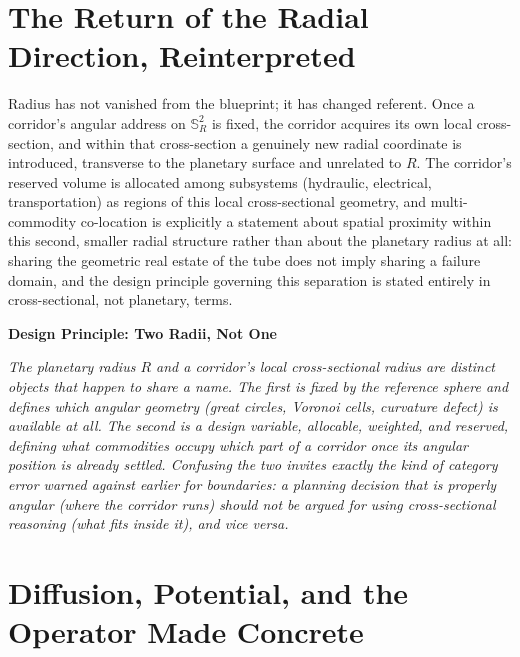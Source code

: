 \documentclass[11pt,fleqn]{book}
\numberwithin{equation}{chapter}
\newenvironment{principle}[1]
  {\begin{principleEnv}
   \noindent\textbf{Design Principle: #1}\par\smallskip\itshape}
  {\end{principleEnv}}
\theoremstyle{plain}
\theoremstyle{definition}
\theoremstyle{remark}
\newcommand{\Sphere}{\mathbb{S}^{2}}
\begin{document}
\section{The Return of the Radial Direction, Reinterpreted}

Radius has not vanished from the blueprint; it has changed referent. Once a corridor's angular address on \(\Sphere_R\) is fixed, the corridor acquires its own local cross-section, and within that cross-section a genuinely new radial coordinate is introduced, transverse to the planetary surface and unrelated to \(R\). The corridor's reserved volume is allocated among subsystems (hydraulic, electrical, transportation) as regions of this local cross-sectional geometry, and multi-commodity co-location is explicitly a statement about spatial proximity within this second, smaller radial structure rather than about the planetary radius at all: sharing the geometric real estate of the tube does not imply sharing a failure domain, and the design principle governing this separation is stated entirely in cross-sectional, not planetary, terms.

\begin{principle}{Two Radii, Not One}
The planetary radius \(R\) and a corridor's local cross-sectional radius are distinct objects that happen to share a name. The first is fixed by the reference sphere and defines which angular geometry (great circles, Voronoi cells, curvature defect) is available at all. The second is a design variable, allocable, weighted, and reserved, defining what commodities occupy which part of a corridor once its angular position is already settled. Confusing the two invites exactly the kind of category error warned against earlier for boundaries: a planning decision that is properly angular (where the corridor runs) should not be argued for using cross-sectional reasoning (what fits inside it), and vice versa.
\end{principle}

\section{Diffusion, Potential, and the Operator Made Concrete}
\end{document}
